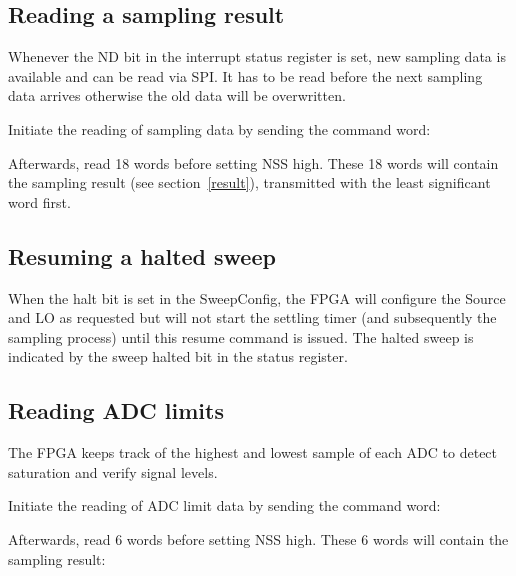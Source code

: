 \documentclass{article}
\newcommand{\bitrect}[2]{
  \begin{pgfonlayer}{foreground}
    \draw [thick] (0,0) rectangle (#1,1);
    \pgfmathsetmacro\result{#1-1}
    \foreach \x in {1,...,\result}
      \draw [thick] (\x,1) -- (\x, 0.8);
  \end{pgfonlayer}
  \bitlabels{#1}{#2}
}
\newcommand{\rwbits}[3]{
  \draw [thick] (#1,0) rectangle ++(#2,1) node[pos=0.5]{#3};
  \pgfmathsetmacro\start{#1+0.5}
  \pgfmathsetmacro\finish{#1+#2-0.5}
}
\newcommand{\robits}[3]{
  \begin{pgfonlayer}{background}
    \draw [thick, fill=lightgray] (#1,0) rectangle ++(#2,1) node[pos=0.5]{#3};
  \end{pgfonlayer}
  \pgfmathsetmacro\start{#1+0.5}
  \pgfmathsetmacro\finish{#1+#2-0.5}
}
\newcommand{\bitlabels}[2]{
  \foreach \bit in {1,...,#1}{
     \pgfmathsetmacro\result{#2}
     \node [above] at (\bit-0.5, 1) {\pgfmathprintnumber{\result}};
   }
}
\begin{document}
\subsection{Reading a sampling result}
Whenever the ND bit in the interrupt status register is set, new sampling data is available and can be read via SPI. It has to be read before the next sampling data arrives otherwise the old data will be overwritten.

Initiate the reading of sampling data by sending the command word:
\begin{center}
\end{center}
Afterwards, read 18 words before setting NSS high. These 18 words will contain the sampling result (see section~\ref{result}), transmitted with the least significant word first.

\subsection{Resuming a halted sweep}
When the halt bit is set in the SweepConfig, the FPGA will configure the Source and LO as requested but will not start the settling timer (and subsequently the sampling process) until this resume command is issued. The halted sweep is indicated by the sweep halted bit in the status register.
\begin{center}
\end{center}

\subsection{Reading ADC limits}
The FPGA keeps track of the highest and lowest sample of each ADC to detect saturation and verify signal levels.

Initiate the reading of ADC limit data by sending the command word:
\begin{center}
\end{center}
Afterwards, read 6 words before setting NSS high. These 6 words will contain the sampling result:
\end{document}
